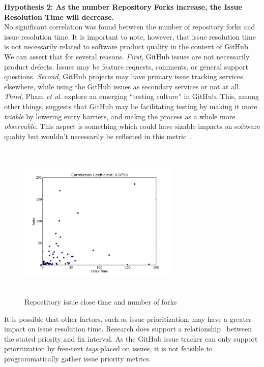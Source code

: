 \documentclass{proc}
\begin{document}
{{{{{{\noindent \textbf{Hypothesis 2: As the number Repository Forks increase, the Issue Resolution Time will decrease.}\\
No significant correlation was found between the number of repository forks and issue resolution time. It is important to note, however, that issue resolution time is not necessarily related to software product quality in the context of GitHub. We can assert that for several reasons. \textit{First}, GitHub issues are not necessarily product defects. Issues may be feature requests, comments, or general support questions. \textit{Second}, GitHub projects may have primary issue tracking services elsewhere, while using the GitHub issues as secondary services or not at all. \textit{Third}, Pham \textit{et al.} explore an emerging ``testing culture'' in GitHub. This, among other things, suggests that GitHub may be facilitating testing by making it more \emph{triable} by lowering entry barriers, and makng the process as a whole more \emph{observable}. This aspect is something which could have sizable impacts on software quality but wouldn't necessarily be reflected in this metric~\cite{phamcreating}.

\begin{figure}
\includegraphics[height=3in,width=3in]{images/issue_close_time_forks_scatterplot.png}
\caption{Repostitory issue close time and number of forks}
\label{fig:issue_close_time_forks_scatterplot}
\end{figure}

It is possible that other factors, such as issue prioritization, may have a greater impact on issue resolution time. Research does support a relationship~\cite{mockus2002two} between the stated priority and fix interval. As the GitHub issue tracker can only support prioritization by free-text \textit{tags} placed on issues, it is not feasible to programmatically gather issue priority metrics.\\

}}}}}}
\end{document}

